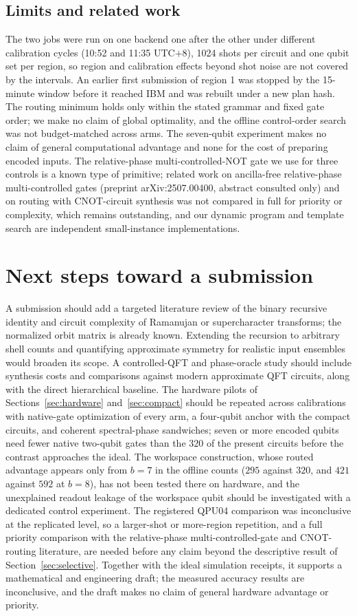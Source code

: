 \documentclass[11pt]{article}
\begin{document}
\subsection{Limits and related work}
The two jobs were run on one backend one after the other under different calibration cycles (10:52 and 11:35 UTC$+8$), 1024 shots per circuit and one qubit set per region, so region and calibration effects beyond shot noise are not covered by the intervals. An earlier first submission of region 1 was stopped by the 15-minute window before it reached IBM and was rebuilt under a new plan hash. The routing minimum holds only within the stated grammar and fixed gate order; we make no claim of global optimality, and the offline control-order search was not budget-matched across arms. The seven-qubit experiment makes no claim of general computational advantage and none for the cost of preparing encoded inputs. The relative-phase multi-controlled-NOT gate we use for three controls is a known type of primitive; related work on ancilla-free relative-phase multi-controlled gates (preprint arXiv:2507.00400, abstract consulted only) and on routing with CNOT-circuit synthesis \cite{qplrouting} was not compared in full for priority or complexity, which remains outstanding, and our dynamic program and template search are independent small-instance implementations.

\section{Next steps toward a submission}
A submission should add a targeted literature review of the binary recursive identity and circuit complexity of Ramanujan or supercharacter transforms; the normalized orbit matrix is already known. Extending the recursion to arbitrary shell counts and quantifying approximate symmetry for realistic input ensembles would broaden its scope. A controlled-QFT and phase-oracle study should include synthesis costs and comparisons against modern approximate QFT circuits, along with the direct hierarchical baseline. The hardware pilots of Sections~\ref{sec:hardware} and~\ref{sec:compact} should be repeated across calibrations with native-gate optimization of every arm, a four-qubit anchor with the compact circuits, and coherent spectral-phase sandwiches; seven or more encoded qubits need fewer native two-qubit gates than the $320$ of the present circuits before the contrast approaches the ideal. The workspace construction, whose routed advantage appears only from $b=7$ in the offline counts ($295$ against $320$, and $421$ against $592$ at $b=8$), has not been tested there on hardware, and the unexplained readout leakage of the workspace qubit should be investigated with a dedicated control experiment. The registered QPU04 comparison was inconclusive at the replicated level, so a larger-shot or more-region repetition, and a full priority comparison with the relative-phase multi-controlled-gate and CNOT-routing literature, are needed before any claim beyond the descriptive result of Section~\ref{sec:selective}. Together with the ideal simulation receipts, it supports a mathematical and engineering draft; the measured accuracy results are inconclusive, and the draft makes no claim of general hardware advantage or priority.
\end{document}
